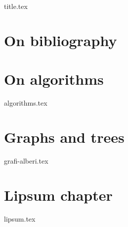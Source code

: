 \documentclass[a4paper,11pt,oneside]{book}
\begin{document}
 
\frontmatter
{title.tex}
 
\clearpage
\thispagestyle{empty}
 
\tableofcontents
 
\mainmatter
\chapter{On bibliography}
 
\chapter{On algorithms}
{algorithms.tex}
 
\chapter{Graphs and trees}
{grafi-alberi.tex}
 
\chapter{Lipsum chapter}
{lipsum.tex}
 
 
 
\end{document}
